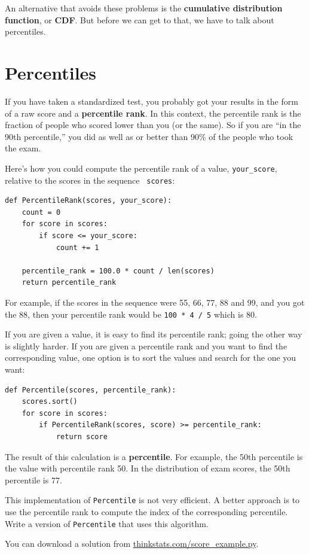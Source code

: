 \documentclass[12pt]{book}
\begin{document}
An alternative that avoids these problems is the {\bf cumulative
distribution function}, or {\bf CDF}.  But before we can get to that,
we have to talk about percentiles.


\section{Percentiles}

If you have taken a standardized test, you probably got your
results in the form of a raw score and a {\bf percentile rank}.
In this context, the percentile rank is the fraction of people who
scored lower than you (or the same).  So if you are ``in the 90th
percentile,'' you did as well as or better than 90\% of the people who
took the exam.

Here's how you could compute the percentile rank of a value,
\verb"your_score", relative to the scores in the sequence {\tt
  scores}:
%
\begin{verbatim}
def PercentileRank(scores, your_score):
    count = 0
    for score in scores:
        if score <= your_score:
            count += 1

    percentile_rank = 100.0 * count / len(scores)
    return percentile_rank
\end{verbatim}
%
%
For example, if the scores in the sequence were 55, 66, 77, 88 and 99,
and you got the 88, then your percentile rank would be {\tt 100 * 4 / 5}
which is 80.

If you are given a value, it is easy to find its percentile rank; going
the other way is slightly harder.  If you are given a percentile rank
and you want to find the corresponding value, one option is to
sort the values and search for the one you want:
%
\begin{verbatim}
def Percentile(scores, percentile_rank):
    scores.sort()
    for score in scores:
        if PercentileRank(scores, score) >= percentile_rank:
            return score
\end{verbatim}

The result of this calculation is a {\bf percentile}.  For example,
the 50th percentile is the value with percentile rank 50.  In the
distribution of exam scores, the 50th percentile is 77.

\begin{exercise}
This implementation of {\tt Percentile} is not very efficient.  A
better approach is to use the percentile rank to compute the index of
the corresponding percentile.  Write a version of {\tt Percentile} that
uses this algorithm.

You can download a solution from \url{thinkstats.com/score_example.py}.

\end{exercise}
\end{document}
